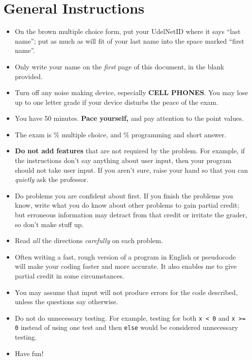 \documentclass[master]{exam}
\begin{document}


\vspace{14pt}


\section*{General Instructions} 

\begin{itemize}
\item On the brown multiple choice form, put your UdelNetID 
  where it says ``last name''; put as much as will fit of your last
  name into the space marked ``first name''.
\item Only write your name on the \emph{first} page of this document, in the
  blank provided.
\item Turn off any noise making device, especially \textbf{CELL
  PHONES}. You may lose up to one letter grade if your device disturbs
  the peace of the exam.

\item You have 50 minutes. {\bf Pace yourself,}
and pay attention to the point values.  

\item The exam is \% multiple choice, and \% programming and short
answer.
 
\item \textbf{Do not add features} that are not required by the problem. For
example, if the instructions don't say anything about user input, then
your program should not take user input. If you aren't sure, raise
your hand so that you can \emph{quietly} ask the professor.

\item Do problems you are confident about first. If you finish the
problems you know, write what you do know about other problems to gain
partial credit; but erroneous information may detract from that
credit or irritate the grader, so don't make stuff up. 

\item Read {\em all} the directions {\em carefully} on each problem.

\item Often writing a fast, rough version of a program in English or
pseudocode will make your coding faster and more accurate. It also
enables me to give partial credit in some circumstances.

\item You may assume that input will not produce errors for the
code described, unless the questions say otherwise. 
 
\item Do not do unnecessary testing. For example, testing for both
\verb+x < 0+ and \verb+x >= 0+ instead of using one test and then
\verb+else+ would be considered unnecessary
testing.

\item Have fun!

\end{itemize}
\end{document}
